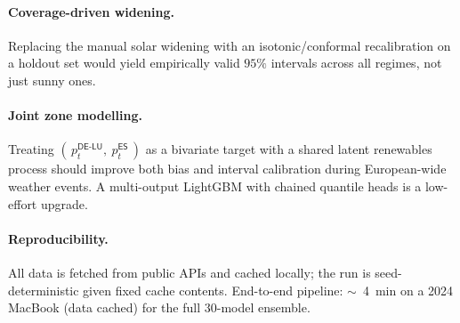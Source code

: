 \documentclass[11pt,a4paper]{article}
\newcommand{\DELU}{\textsf{DE-LU}}
\newcommand{\ES}{\textsf{ES}}
\begin{document}
\paragraph{Coverage-driven widening.}
Replacing the manual solar widening with an isotonic/conformal
recalibration on a holdout set would yield empirically valid
$95\%$ intervals across all regimes, not just sunny ones.

\paragraph{Joint zone modelling.}
Treating $(\,p^{\DELU}_t,\ p^{\ES}_t\,)$ as a bivariate target with a
shared latent renewables process should improve both bias and
interval calibration during European-wide weather events. A
multi-output LightGBM with chained quantile heads is a low-effort
upgrade.

\paragraph{Reproducibility.}
All data is fetched from public APIs and cached locally; the run is
seed-deterministic given fixed cache contents. End-to-end pipeline:
$\sim$~4~min on a 2024 MacBook (data cached) for the full $30$-model
ensemble.
\end{document}

